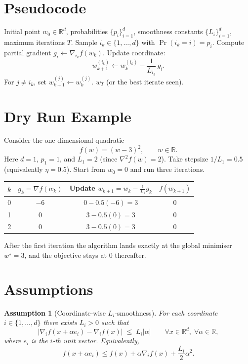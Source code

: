 \documentclass{article}
\newtheorem{assumption}{Assumption}
\newcommand{\R}{\mathbb{R}}
\begin{document}
\section*{Pseudocode}
\begin{algorithm}[H]
\caption{Randomized Coordinate Descent (RCD)}
\begin{algorithmic}[1]
\REQUIRE Initial point $w_0\in\R^d$, probabilities $\{p_i\}_{i=1}^d$, smoothness constants $\{L_i\}_{i=1}^d$, maximum iterations $T$.
    \STATE Sample $i_k\in\{1,\dots,d\}$ with $\Pr(i_k=i)=p_i$.
    \STATE Compute partial gradient $g_i \gets \nabla_{i_k} f(w_k)$.
    \STATE Update coordinate:
    \[
    w_{k+1}^{(i_k)} \gets w_k^{(i_k)} - \frac{1}{L_{i_k}}\, g_i .
    \]
    \STATE For $j\neq i_k$, set $w_{k+1}^{(j)}\gets w_k^{(j)}$.
\ENDFOR
\RETURN $w_T$ (or the best iterate seen).
\end{algorithmic}
\end{algorithm}

\section*{Dry Run Example}
Consider the one‑dimensional quadratic
\[
f(w) = (w-3)^2,\qquad w\in\R .
\]
Here $d=1$, $p_1=1$, and $L_1=2$ (since $\nabla^2 f(w)=2$).  
Take stepsize $1/L_1 = 0.5$ (equivalently $\eta=0.5$).  
Start from $w_0=0$ and run three iterations.

\begin{center}
\begin{tabular}{c|c|c|c}
$k$ & $g_k=\nabla f(w_k)$ & Update $w_{k+1}=w_k-\frac{1}{L_1}g_k$ & $f(w_{k+1})$\\ \hline
0 & $-6$ & $0-0.5(-6)=3$ & $0$\\
1 & $0$  & $3-0.5(0)=3$ & $0$\\
2 & $0$  & $3-0.5(0)=3$ & $0$
\end{tabular}
\end{center}

After the first iteration the algorithm lands exactly at the global
minimiser $w^\star=3$, and the objective stays at $0$ thereafter.

\section*{Assumptions}
\begin{assumption}[Coordinate‑wise $L_i$‑smoothness]\label{ass:smooth}
For each coordinate $i\in\{1,\dots,d\}$ there exists $L_i>0$ such that
\[
\bigl| \nabla_i f(x+ \alpha e_i) - \nabla_i f(x) \bigr|
\;\le\; L_i |\alpha|
\qquad\forall x\in\R^d,\;\forall \alpha\in\R,
\]
where $e_i$ is the $i$‑th unit vector. Equivalently,
\begin{equation}
f(x+\alpha e_i) \le f(x) + \alpha \nabla_i f(x) + \frac{L_i}{2}\alpha^2 .
\tag{2}
\end{equation}
\end{assumption}
\end{document}
